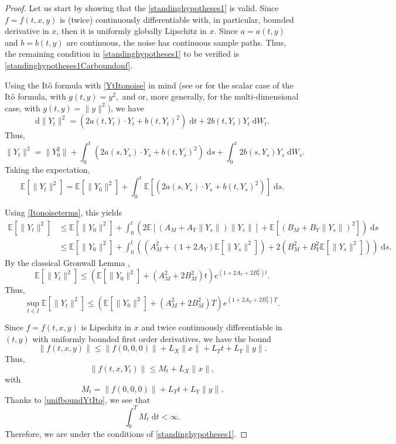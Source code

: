 \documentclass[reqno,12pt]{amsart}
\theoremstyle{plain} %
\theoremstyle{definition} %
\begin{document}
\begin{proof}
    Let us start by showing that the \cref{standinghypotheses1} is valid. Since $f=f(t, x, y)$ is (twice) continuously differentiable with, in particular, bounded derivative in $x$, then it is uniformly globally Lipschitz in $x$. Since $a=a(t, y)$ and $b=b(t, y)$ are continuous, the noise has continuous sample paths. Thus, the remaining condition in \cref{standinghypotheses1} to be verified is \eqref{standinghypotheses1Carboundonf}.

    Using the It\^o formula with \eqref{YtItonoise} in mind (see \cite[Theorem 4.1.2]{Oksendal2003} or \cite[Section 7.4]{Kuo2006} for the scalar case of the It\^o formula, with $g(t, y) = y^2,$ and \cite[Theorem 4.2.1]{Oksendal2003} or, more generally, \cite[Section 7.5]{Kuo2006} for the multi-dimensional case, with $g(t, y) = \|y\|^2$), we have
    \[
        \mathrm{d}\|Y_t\|^2 = \left(2a(t, Y_t) \cdot Y_t  + b(t, Y_t)^2 \right) \;\mathrm{d}t + 2b(t, Y_t) Y_t\;\mathrm{d}W_t.
    \]
    Thus,
    \[
        \|Y_t\|^2 = \|Y_0^2\| + \int_0^t \left(2a(s, Y_s)\cdot Y_s  + b(t, Y_s)^2 \right) \;\mathrm{d}s + \int_0^t 2b(s, Y_s) Y_s\;\mathrm{d}W_s.
    \]
    Taking the expectation,
    \[
        \mathbb{E}[\|Y_t\|^2] = \mathbb{E}[\|Y_0\|^2] + \int_0^t \mathbb{E}\left[\left(2a(s, Y_s) \cdot Y_s  + b(t, Y_s)^2 \right)\right] \;\mathrm{d}s.
    \]

    
    Using \eqref{Itonoiseterms}, this yields
    \begin{align*}
        \mathbb{E}[\|Y_t\|^2] & \leq \mathbb{E}[\|Y_0\|^2] + \int_0^t \left(2\mathbb{E}[(A_M + A_Y \|Y_s\|) \|Y_s\|]  + \mathbb{E}[(B_M + B_Y\|Y_s\|)^2] \right) \;\mathrm{d}s \\
        & \leq \mathbb{E}[\|Y_0\|^2] + \int_0^t \left((A_M^2 + (1 + 2A_Y) \mathbb{E}[\|Y_s\|^2])  + 2(B_M^2 + B_Y^2\mathbb{E}[\|Y_s\|^2]) \right) \;\mathrm{d}s.
    \end{align*}
    By the classical Gronwall Lemma \cite{Gronwall1919},
    \[
        \mathbb{E}[\|Y_t\|^2] \leq \left( \mathbb{E}[\|Y_0\|^2] + (A_M^2 + 2B_M^2)t\right)e^{(1 + 2A_Y + 2B_Y^2)t}.
    \]
    Thus,
    \begin{equation}
        \label{unifboundYtIto}
        \sup_{t\in I}\mathbb{E}[\|Y_t\|^2] \leq \left( \mathbb{E}[\|Y_0\|^2] + (A_M^2 + 2B_M^2)T\right)e^{(1 + 2A_Y + 2B_Y^2)T}.
    \end{equation}

    Since $f=f(t, x, y)$ is Lipschitz in $x$ and twice continuously differentiable in $(t, y)$ with uniformly bounded first order derivatives, we have the bound
    \[
        \|f(t, x, y)\| \leq \|f(0, 0, 0)\| + L_X\|x\| + L_T t + L_Y\|y\|.
    \]
    Thus,
    \[
        \|f(t, x, Y_t)\| \leq M_t + L_X\|x\|,
    \]
    with
    \[
        M_t = \|f(0, 0, 0)\| + L_T t + L_Y\|y\|.
    \]
    Thanks to \eqref{unifboundYtIto}, we see that
    \[
        \int_0^T M_t\;\mathrm{d}t < \infty.
    \]
    Therefore, we are under the conditions of \cref{standinghypotheses1}.


\end{proof}
\end{document}
